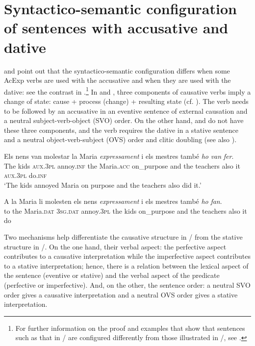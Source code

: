 \documentclass[output=paper,colorlinks,citecolor=brown,modfonts,nonflat]{langsci/langscibook}
\begin{document}
\section{Syntactico-semantic configuration of sentences with accusative and dative}\label{sec:royo:2}

\citet{Ynglès1991} and \citet{CabréMateu1998} point out that the syntactico-semantic configuration differs when some AcExp verbs are used with the accusative and when they are used with the dative: see the contrast in .\footnote{For further information on the proof and examples that show that sentences such as that in  / are configured differently from those illustrated in /, see \citet[Section 4.1]{Royo2017}.} In  and , three components of causative verbs imply a change of state: cause + process (change) + resulting state (cf. \citealt{LevinRappaportHovav1995, CabréMateu1998, Rossello2008}). The verb needs to be followed by an accusative in an eventive sentence of external causation and a neutral subject-verb-object (SVO) order. On the other hand,  and  do not have these three components, and the verb requires the dative in a stative sentence and a neutral object-verb-subject (OVS) order and clitic doubling (see also ).

\ea%
 \label{ex:royo:3}
 \ea \label{ex:royo:3a}
 \gll Els nens van molestar la Maria \emph{expressament} i els mestres també \emph{ho} \emph{van} \emph{fer}. \\
The kids \textsc{aux.3pl} annoy.\textsc{inf} the Maria.\textsc{acc} on\_purpose     and the teachers also     it  \textsc{aux.3pl} do.\textsc{inf}\\
 \glt ‘The kids annoyed Maria on purpose and the teachers also did it.’

 \ex \label{ex:royo:3b}
 \gll *A la Maria li molesten els nens \emph{expressament} i els mestres també \emph{ho} \emph{fan}.\\
  to the Maria.\textsc{dat} \textsc{3sg.dat} annoy.\textsc{3pl} the kids on\_purpose     and the teachers also    it   do\\
\glt

 \z
 \z

Two mechanisms help differentiate the causative structure in / from the stative structure in /. On the one hand, their verbal aspect: the perfective aspect contributes to a causative interpretation while the imperfective aspect contributes to a stative interpretation; hence, there is a relation between the lexical aspect of the sentence (eventive or stative) and the verbal aspect of the predicate (perfective or imperfective). And, on the other, the sentence order: a neutral SVO order gives a causative interpretation and a neutral OVS order gives a stative interpretation.
\end{document}
